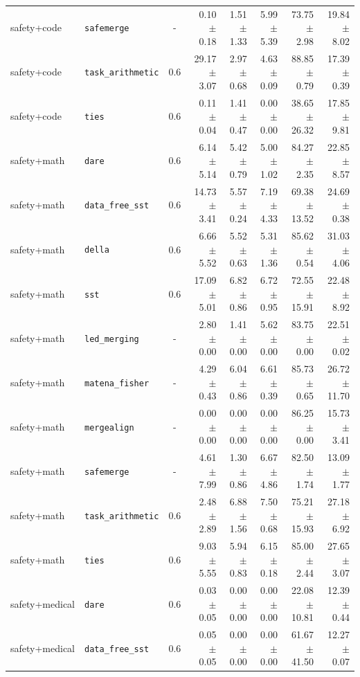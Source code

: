 \documentclass{article}
\begin{document}
\begin{table}[H]
{\begin{tabular}{llcrrrrr}
safety+code & \texttt{safemerge} & - & 0.10 $\pm$ 0.18 & 1.51 $\pm$ 1.33 & 5.99 $\pm$ 5.39 & 73.75 $\pm$ 2.98 & 19.84 $\pm$ 8.02 \\
safety+code & \texttt{task\_arithmetic} & 0.6 & 29.17 $\pm$ 3.07 & 2.97 $\pm$ 0.68 & 4.63 $\pm$ 0.09 & 88.85 $\pm$ 0.79 & 17.39 $\pm$ 0.39 \\
safety+code & \texttt{ties} & 0.6 & 0.11 $\pm$ 0.04 & 1.41 $\pm$ 0.47 & 0.00 $\pm$ 0.00 & 38.65 $\pm$ 26.32 & 17.85 $\pm$ 9.81 \\
\midrule
safety+math & \texttt{dare} & 0.6 & 6.14 $\pm$ 5.14 & 5.42 $\pm$ 0.79 & 5.00 $\pm$ 1.02 & 84.27 $\pm$ 2.35 & 22.85 $\pm$ 8.57 \\
safety+math & \texttt{data\_free\_sst} & 0.6 & 14.73 $\pm$ 3.41 & 5.57 $\pm$ 0.24 & 7.19 $\pm$ 4.33 & 69.38 $\pm$ 13.52 & 24.69 $\pm$ 0.38 \\
safety+math & \texttt{della} & 0.6 & 6.66 $\pm$ 5.52 & 5.52 $\pm$ 0.63 & 5.31 $\pm$ 1.36 & 85.62 $\pm$ 0.54 & 31.03 $\pm$ 4.06 \\
safety+math & \texttt{sst} & 0.6 & 17.09 $\pm$ 5.01 & 6.82 $\pm$ 0.86 & 6.72 $\pm$ 0.95 & 72.55 $\pm$ 15.91 & 22.48 $\pm$ 8.92 \\
safety+math & \texttt{led\_merging} & - & 2.80 $\pm$ 0.00 & 1.41 $\pm$ 0.00 & 5.62 $\pm$ 0.00 & 83.75 $\pm$ 0.00 & 22.51 $\pm$ 0.02 \\
safety+math & \texttt{matena\_fisher} & - & 4.29 $\pm$ 0.43 & 6.04 $\pm$ 0.86 & 6.61 $\pm$ 0.39 & 85.73 $\pm$ 0.65 & 26.72 $\pm$ 11.70 \\
safety+math & \texttt{mergealign} & - & 0.00 $\pm$ 0.00 & 0.00 $\pm$ 0.00 & 0.00 $\pm$ 0.00 & 86.25 $\pm$ 0.00 & 15.73 $\pm$ 3.41 \\
safety+math & \texttt{safemerge} & - & 4.61 $\pm$ 7.99 & 1.30 $\pm$ 0.86 & 6.67 $\pm$ 4.86 & 82.50 $\pm$ 1.74 & 13.09 $\pm$ 1.77 \\
safety+math & \texttt{task\_arithmetic} & 0.6 & 2.48 $\pm$ 2.89 & 6.88 $\pm$ 1.56 & 7.50 $\pm$ 0.68 & 75.21 $\pm$ 15.93 & 27.18 $\pm$ 6.92 \\
safety+math & \texttt{ties} & 0.6 & 9.03 $\pm$ 5.55 & 5.94 $\pm$ 0.83 & 6.15 $\pm$ 0.18 & 85.00 $\pm$ 2.44 & 27.65 $\pm$ 3.07 \\
\midrule
safety+medical & \texttt{dare} & 0.6 & 0.03 $\pm$ 0.05 & 0.00 $\pm$ 0.00 & 0.00 $\pm$ 0.00 & 22.08 $\pm$ 10.81 & 12.39 $\pm$ 0.44 \\
safety+medical & \texttt{data\_free\_sst} & 0.6 & 0.05 $\pm$ 0.05 & 0.00 $\pm$ 0.00 & 0.00 $\pm$ 0.00 & 61.67 $\pm$ 41.50 & 12.27 $\pm$ 0.07 \\

\end{tabular}}
\end{table}
\end{document}
